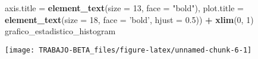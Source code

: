 \documentclass[
]{article}
\newenvironment{Shaded}{\begin{snugshade}}{\end{snugshade}}
\newcommand{\DataTypeTok}[1]{\textcolor[rgb]{0.13,0.29,0.53}{#1}}
\newcommand{\DecValTok}[1]{\textcolor[rgb]{0.00,0.00,0.81}{#1}}
\newcommand{\FloatTok}[1]{\textcolor[rgb]{0.00,0.00,0.81}{#1}}
\newcommand{\KeywordTok}[1]{\textcolor[rgb]{0.13,0.29,0.53}{\textbf{#1}}}
\newcommand{\NormalTok}[1]{#1}
\newcommand{\OperatorTok}[1]{\textcolor[rgb]{0.81,0.36,0.00}{\textbf{#1}}}
\newcommand{\StringTok}[1]{\textcolor[rgb]{0.31,0.60,0.02}{#1}}
\begin{document}
\begin{Shaded}
\begin{Highlighting}[]
              \DataTypeTok{axis.title =} \KeywordTok{element_text}\NormalTok{(}\DataTypeTok{size =} \DecValTok{13}\NormalTok{, }\DataTypeTok{face =} \StringTok{"bold"}\NormalTok{), }
              \DataTypeTok{plot.title =} \KeywordTok{element_text}\NormalTok{(}\DataTypeTok{size =} \DecValTok{18}\NormalTok{, }\DataTypeTok{face =} \StringTok{'bold'}\NormalTok{, }
                                        \DataTypeTok{hjust =} \FloatTok{0.5}\NormalTok{)) }\OperatorTok{+}\StringTok{ }
\StringTok{        }\KeywordTok{xlim}\NormalTok{(}\DecValTok{0}\NormalTok{, }\DecValTok{1}\NormalTok{)}
\NormalTok{grafico_estadistico_histogram}
\end{Highlighting}
\end{Shaded}

\begin{center}\texttt{[image: TRABAJO-BETA\_files/figure-latex/unnamed-chunk-6-1]} \end{center}
\end{document}
